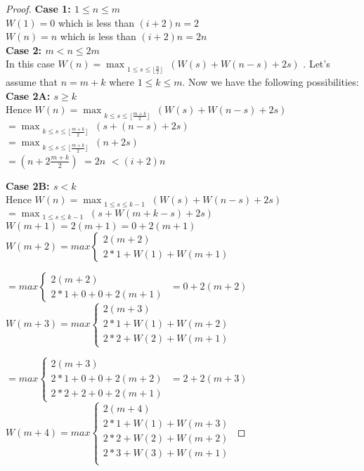 \begin{appendix}
\begin{proof}
\noindent
\textbf{Case 1: $1\leq n \leq m$}\\
$W(1)=0$ which is less than $(i+2)n=2$ \\
$W(n)=n$ which is less than $(i+2)n=2n$ 
\\
\noindent
\textbf{Case 2: $m < n \leq 2m$}\\
In this case $W(n)=\max_{\substack{1 \leq s \leq \lfloor \frac{n}{2}\rfloor}}(W(s)+ W(n-s)+2s)$ . 
Let's assume that $n=m+k$ where $1\leq k \leq m$. Now we have the following possibilities:
\\
\noindent
\textbf{Case 2A: $ s \geq k$}\\
Hence $W(n)=\max_{\substack{k \leq s \leq \lfloor \frac{m+k}{2}\rfloor}}(W(s)+ W(n-s)+2s)$
\\
$ = \max_{\substack{k \leq s \leq \lfloor \frac{m+k}{2}\rfloor}}(s+ (n-s)+2s)$
\\
$ = \max_{\substack{k \leq s \leq \lfloor \frac{m+k}{2}\rfloor}}(n+2s)$
\\
$ = (n+2\frac{m+k}{2})$
$ = 2n$
$< (i+2)n$

\noindent
\textbf{Case 2B: $ s < k$}\\
Hence $W(n)=\max_{\substack{1 \leq s \leq k-1}}(W(s)+ W(n-s)+2s)$
\\
$ = \max_{\substack{1 \leq s \leq k-1}}(s+ W(m+k-s)+2s)$
\\
$W(m+1)=2(m+1)= 0+2(m+1)$
\\
$W(m+2)=max\left\{ 
\begin{array}{l}
2(m+2)\\
2*1+W(1)+W(m+1)
\end{array} \right.$

$=max\left\{ 
\begin{array}{l}
2(m+2)\\
2*1+0+0+2(m+1)
\end{array}\right.$
$=0+2(m+2)$
\\
$W(m+3)=max\left\{ 
\begin{array}{l}
2(m+3)\\
2*1+W(1)+W(m+2)\\
2*2+W(2)+W(m+1)
\end{array}\right.$

$=max\left\{ 
\begin{array}{l}
2(m+3)\\
2*1+0+0+2(m+2)\\
2*2+2+0+2(m+1)
\end{array} \right.$
$=2+2(m+3)$
\\
$W(m+4)=max\left\{ 
\begin{array}{l}
2(m+4)\\
2*1+W(1)+W(m+3)\\
2*2+W(2)+W(m+2)\\
2*3+W(3)+W(m+1)\\
\end{array}\right.$


\end{proof}
\end{appendix}
